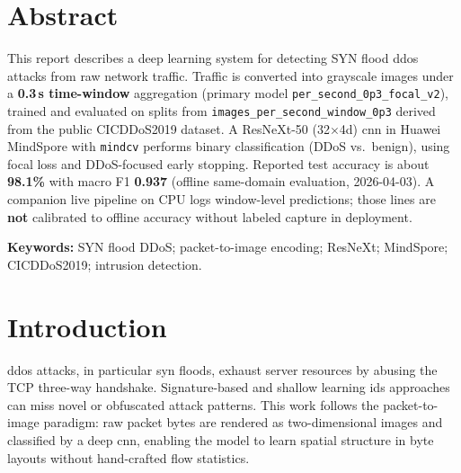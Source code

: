 \indent
{}
\newpage
\chapter*{Abstract}
This report describes a deep learning system for detecting SYN flood
\gls{ddos} attacks from raw network traffic. Traffic is converted into grayscale
images under a \textbf{0.3\,s time-window} aggregation (primary model
\mbox{\texttt{per\_second\_0p3\_focal\_v2}}), trained and evaluated on splits from
\mbox{\texttt{images\_per\_second\_window\_0p3}} derived from the public CICDDoS2019
dataset. A ResNeXt-50 (32$\times$4d) \gls{cnn} in Huawei MindSpore with
\mbox{\texttt{mindcv}} performs binary classification (DDoS vs.\ benign), using focal
loss and DDoS-focused early stopping. Reported test accuracy is about
\textbf{98.1\%} with macro F1 \textbf{0.937} (offline same-domain evaluation,
2026-04-03). A companion live pipeline on CPU logs window-level predictions;
those lines are \textbf{not} calibrated to offline accuracy without labeled
capture in deployment.

\vspace{1em}
\noindent\textbf{Keywords:} SYN flood DDoS; packet-to-image encoding; ResNeXt; MindSpore; \mbox{CICDDoS2019}; intrusion detection.

\newpage
\tableofcontents
\newpage
\listoftables
{}
\newpage
\listoffigures
{}
\newpage
\listofequation
{}
\newpage
{}
{}
\printglossary[title={List of Abbreviations},type=\acronymtype,nonumberlist]

\newpage
{}



\chapter{Introduction}

\Gls{ddos} attacks, in particular \gls{syn} floods, exhaust server resources by
abusing the TCP three-way handshake. Signature-based and shallow learning
\gls{ids} approaches can miss novel or obfuscated attack patterns. This work
follows the packet-to-image paradigm: raw packet bytes are rendered as
two-dimensional images and classified by a deep \gls{cnn}, enabling the model to
learn spatial structure in byte layouts without hand-crafted flow statistics.

